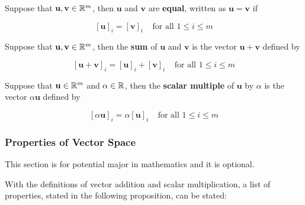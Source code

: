 \documentclass[a4paper,12pt]{article}
\begin{document}
\begin{dft}
  Suppose that $\mathbf{u},\mathbf{v}\in\mathbb{R}^{m}$, then $\mathbf{u}$ and $\mathbf{v}$ are \textbf{equal}, written as $\mathbf{u}=\mathbf{v}$ if

  $$[\mathbf{u}]_{i}=[\mathbf{v}]_{i}\;\;\;\;\text{for all }1\leq i\leq m$$
\end{dft}\n

\begin{dft}
  Suppose that $\mathbf{u},\mathbf{v}\in\mathbb{R}^{m}$, then the \textbf{sum} of $\mathbf{u}$ and $\mathbf{v}$ is the vector $\mathbf{u}+\mathbf{v}$ defined by

  $$[\mathbf{u}+\mathbf{v}]_{i}=[\mathbf{u}]_{i}+[\mathbf{v}]_{i}\;\;\;\;\text{for all }1\leq i\leq m$$
\end{dft}\n

\begin{dft}
  Suppose that $\mathbf{u}\in\mathbb{R}^{m}$ and $\alpha\in\mathbb{R}$, then the \textbf{scalar multiple} of $\mathbf{u}$ by $\alpha$ is the vector $\alpha\mathbf{u}$ defined by

  $$[\alpha\mathbf{u}]_{i}=\alpha[\mathbf{u}]_{i}\;\;\;\;\text{for all }1\leq i\leq m$$
\end{dft}

\subsubsection{Properties of Vector Space}
\begin{cmt}
  This section is for potential major in mathematics and it is optional.
\end{cmt}\n

With the definitions of vector addition and scalar multiplication, a list of properties, stated in the following proposition, can be stated:\n
\end{document}
